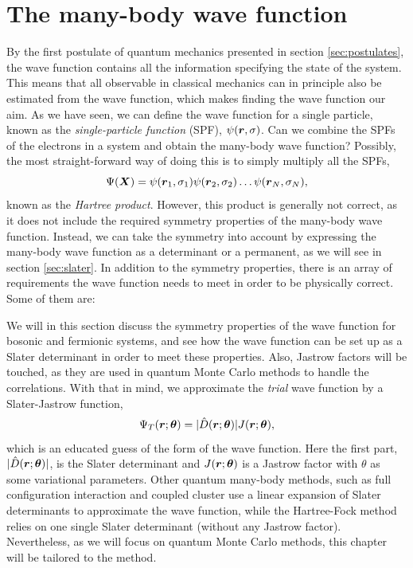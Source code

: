 \section{The many-body wave function} \label{sec:wavefunction}
By the first postulate of quantum mechanics presented in section \ref{sec:postulates}, the wave function contains all the information specifying the state of the system. This means that all observable in classical mechanics can in principle also be estimated from the wave function, which makes finding the wave function our aim. As we have seen, we can define the wave function for a single particle, known as the \textit{single-particle function} (SPF), $\psi(\boldsymbol{{r}},\sigma)$. Can we combine the SPFs of the electrons in a system and obtain the many-body wave function? Possibly, the most straight-forward way of doing this is to simply multiply all the SPFs,
\begin{equation}
\Psi(\boldsymbol{{X}})=\psi(\boldsymbol{{r}}_1,\sigma_1)\psi(\boldsymbol{{r}}_2,\sigma_2)\hdots\psi(\boldsymbol{{r}}_N,\sigma_N),
\end{equation}
known as the \textit{Hartree product}. However, this product is generally not correct, as it does not include the required symmetry properties of the many-body wave function. Instead, we can take the symmetry into account by expressing the many-body wave function as a determinant or a permanent, as we will see in section \ref{sec:slater}. In addition to the symmetry properties, there is an array of requirements the wave function needs to meet in order to be physically correct. Some of them are:

\iffalse
We will in this section discuss the symmetry properties of the wave function for bosonic and fermionic systems, and see how the wave function can be set up as a Slater determinant in order to meet these properties. Also, Jastrow factors will be touched, as they are used in quantum Monte Carlo methods to handle the correlations. With that in mind, we approximate the \textit{trial} wave function by a Slater-Jastrow function,
\begin{equation}
\Psi_T(\boldsymbol{{r}};\boldsymbol{{\theta}})=|\hat{D}(\boldsymbol{{r}};\boldsymbol{{\theta}})|J(\boldsymbol{{r}};\boldsymbol{{\theta}}),
\end{equation}
which is an educated guess of the form of the wave function. 
Here the first part, $|\hat{D}(\boldsymbol{{r}};\boldsymbol{{\theta}})|$, is the Slater determinant and $J(\boldsymbol{{r}};\boldsymbol{{\theta}})$ is a Jastrow factor with $\theta$ as some variational parameters. Other quantum many-body methods, such as full configuration interaction and coupled cluster use a linear expansion of Slater determinants to approximate the wave function, while the Hartree-Fock method relies on one single Slater determinant (without any Jastrow factor). Nevertheless, as we will focus on quantum Monte Carlo methods, this chapter will be tailored to the method. 

